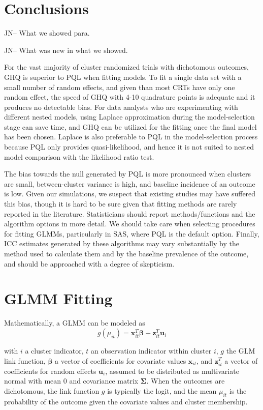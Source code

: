 \documentclass{article}
\begin{document}
\begin{flushleft}
\section{Conclusions}

JN-- What we showed para.

JN-- What was new in what we showed.

For the vast majority of cluster randomized trials with dichotomous outcomes, GHQ is superior to PQL when fitting models. To fit a single data set with a small number of random effects, and given than most CRTs have only one random effect, the speed of GHQ with 4-10 quadrature points is adequate and it produces no detectable bias. For data analysts who are experimenting with different nested models, using Laplace approximation during the model-selection stage can save time, and GHQ can be utilized for the fitting once the final model has been chosen. Laplace is also preferable to PQL in the model-selection process because PQL only provides quasi-likelihood, and hence it is not suited to nested model comparison with the likelihood ratio test.

The bias towards the null generated by PQL is more pronounced when clusters are small, between-cluster variance is high, and baseline incidence of an outcome is low. Given our simulations, we suspect that existing studies may have suffered this bias, though it is hard to be sure given that fitting methods are rarely reported in the literature. Statisticians should report methods/functions and the algorithm options in more detail.  We should take care when selecting procedures for fitting GLMMs, particularly in SAS, where PQL is the default option. Finally, ICC estimates generated by these algorithms may vary substantially by the method used to calculate them and by the baseline prevalence of the outcome, and should be approached with a degree of skepticism.

\appendix
\section{GLMM Fitting}
Mathematically, a GLMM can be modeled as
    \begin{equation}
        g(\mu_{it})=\mathbf{x}^T_{it} \boldsymbol{\beta} + \mathbf{z}^T_{it}\mathbf{u}_i
    \end{equation}
    
    with
 $i$ a cluster indicator, $t$ an observation indicator within cluster $i$, $g$ the GLM link function, $\boldsymbol{\beta}$ a vector of coefficients for covariate values $\mathbf{x}_{it}$, and $\mathbf{z}^T_{it}$ a vector of coefficients for random effects $\mathbf{u}_i$, assumed to be distributed as multivariate normal with mean $0$ and covariance matrix $\mathbf{\Sigma}$. When the outcomes are dichotomous, the link function $g$ is typically the logit, and the mean $\mu_{it}$ is the probability of the outcome given the covariate values and cluster membership.
 

\end{flushleft}
\end{document}
